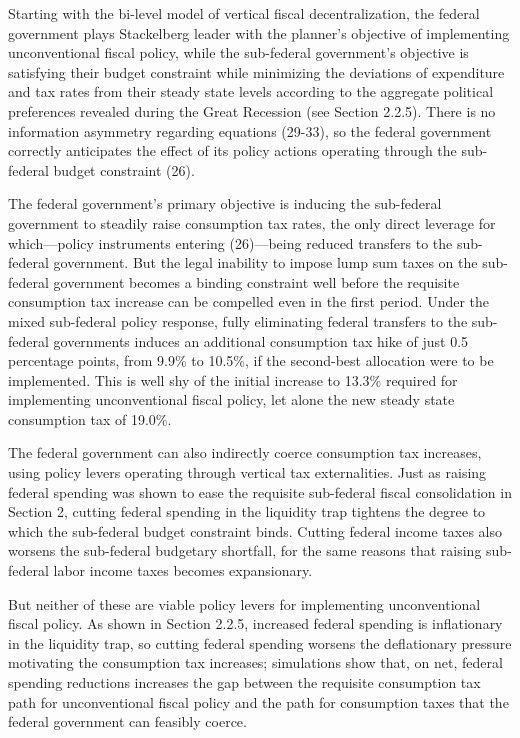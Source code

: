 \documentclass[12pt,letterpaper]{article}
\begin{document}
Starting with the bi-level model of vertical fiscal decentralization, the federal government plays Stackelberg leader with the planner's objective of implementing unconventional fiscal policy, while the sub-federal government's objective is satisfying their budget constraint while minimizing the deviations of expenditure and tax rates from their steady state levels according to the aggregate political preferences revealed during the Great Recession (see Section 2.2.5). There is no information asymmetry regarding equations (29-33), so the federal government correctly anticipates the effect of its policy actions operating through the sub-federal budget constraint (26). 

The federal government's primary objective is inducing the sub-federal government to steadily raise consumption tax rates, the only direct leverage for which---policy instruments entering (26)---being reduced transfers to the sub-federal government. But the legal inability to impose lump sum taxes on the sub-federal government becomes a binding constraint well before the requisite consumption tax increase can be compelled even in the first period. Under the mixed sub-federal policy response, fully eliminating federal transfers to the sub-federal governments induces an additional consumption tax hike of just 0.5 percentage points, from 9.9\% to 10.5\%, if the second-best allocation were to be implemented. This is well shy of the initial increase to 13.3\% required for implementing unconventional fiscal policy, let alone the new steady state consumption tax of 19.0\%.

The federal government can also indirectly coerce consumption tax increases, using policy levers operating through vertical tax externalities. Just as raising federal spending was shown to ease the requisite sub-federal fiscal consolidation in Section 2, cutting federal spending in the liquidity trap tightens the degree to which the sub-federal budget constraint binds. Cutting federal income taxes also worsens the sub-federal budgetary shortfall, for the same reasons that raising sub-federal labor income taxes becomes expansionary.

But neither of these are viable policy levers for implementing unconventional fiscal policy. As shown in Section 2.2.5, increased federal spending is inflationary in the liquidity trap, so cutting federal spending worsens the deflationary pressure motivating the consumption tax increases; simulations show that, on net, federal spending reductions increases the gap between the requisite consumption tax path for unconventional fiscal policy and the path for consumption taxes that the federal government can feasibly coerce.
\end{document}
